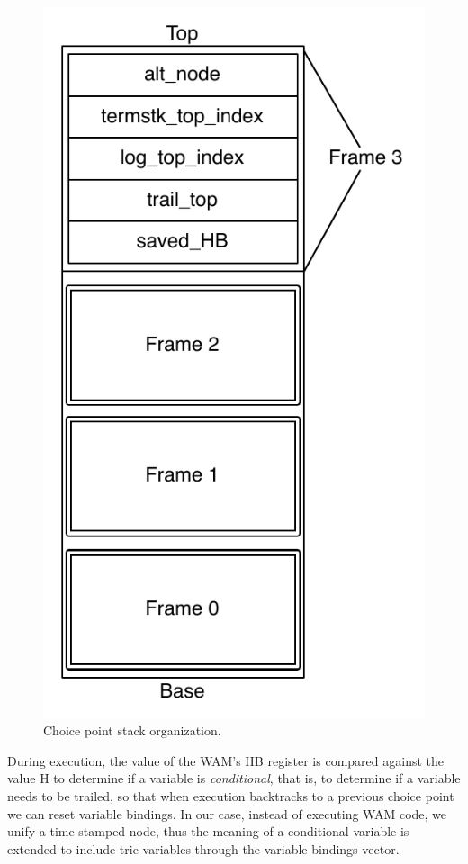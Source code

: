 \begin{figure}[H]
  \centering
    \includegraphics[scale=0.6]{choice_point_stack.pdf}
  \caption{Choice point stack organization.}
  \label{fig:choice_point_stack}
\end{figure}

During execution, the value of the WAM's HB register is compared against the value H to determine if a variable is \textit{conditional}, that is, to determine if a variable needs to be trailed, so that when execution backtracks to a previous choice point we can reset variable bindings. In our case, instead of executing WAM code, we unify a time stamped node, thus the meaning of a conditional variable is extended to include trie variables through the variable bindings vector.

